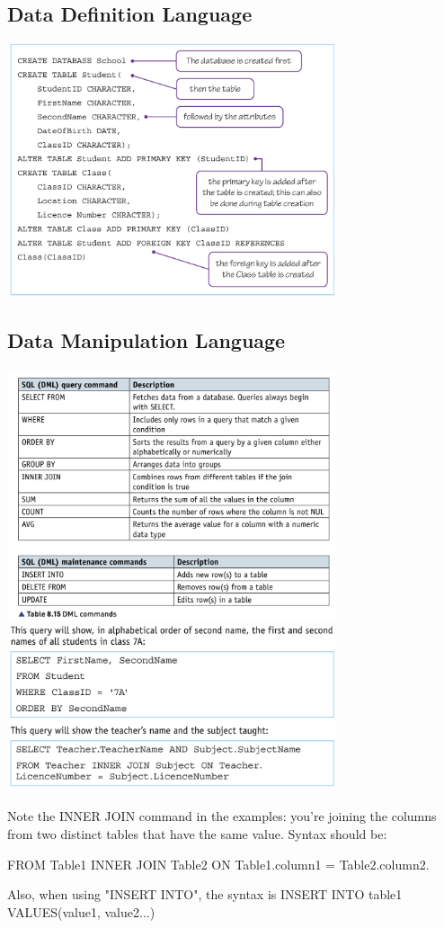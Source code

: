 \documentclass{article}
\theoremstyle{mytheoremstyle}
\theoremstyle{mytheoremstyle}
\theoremstyle{myproblemstyle}
\begin{document}
    \subsection{Data Definition Language}
    \begin{center}
        \includegraphics[width = 275pt]{Capture-2025-09-06-154943.png}
    \end{center}

    \subsection{Data Manipulation Language}
    \begin{center}
        \includegraphics[width = 275pt]{Capture-2025-09-06-155844.png}
        \includegraphics[width = 275pt]{image copy.png}
    \end{center}

    Note the INNER JOIN command in the examples: you're joining the columns from two distinct tables that have the same value. Syntax should be: 

    FROM Table1 INNER JOIN Table2 ON Table1.column1 = Table2.column2.

    Also, when using "INSERT INTO", the syntax is INSERT INTO table1 VALUES(value1, value2...)

    




    
\end{document}
